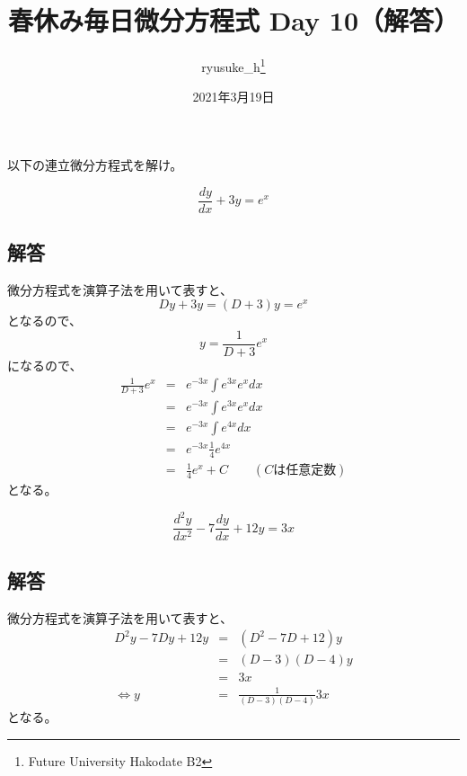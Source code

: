 \documentclass[a4j]{jsarticle}
\title{春休み毎日微分方程式 Day 10（解答）}
\author{ryusuke\_h\thanks{Future University Hakodate B2}}
\date{2021年3月19日}
\begin{document}
\begin{spacing}{1.6}
\maketitle

以下の連立微分方程式を解け。\\
\begin{qparts}
  \qpart
  \begin{equation*}
    \frac{dy}{dx} + 3y = e ^ x
  \end{equation*}

  \subsection*{解答}

  微分方程式を演算子法を用いて表すと、
  \begin{equation*}
    Dy + 3y = (D + 3)y = e ^ x
  \end{equation*}
  となるので、
  \begin{equation*}
    y = \frac{1}{D + 3}e ^ x
  \end{equation*}
  になるので、
  \begin{eqnarray*}
    \frac{1}{D + 3}e ^ x & = & e ^ {-3x} \int e ^ {3x} e ^ x dx \\
    & = & e ^ {-3x} \int e ^ {3x} e ^ x dx \\
    & = & e ^ {-3x} \int e ^ {4x} dx \\
    & = & e ^ {-3x} \frac{1}{4}e ^ {4x} \\
    & = & \frac{1}{4}e ^ x + C \qquad (Cは任意定数)
  \end{eqnarray*}
  となる。

  \newpage

  \qpart
  \begin{equation*}
    \frac{d^2y}{dx^2} - 7 \frac{dy}{dx} + 12y = 3x
  \end{equation*}

  \subsection*{解答}

  微分方程式を演算子法を用いて表すと、
  \begin{eqnarray*}
    D ^ 2y - 7Dy + 12y & = & (D ^ 2 - 7D + 12)y \\
    & = & (D - 3)(D - 4)y \\
    & = & 3x \\
    \Leftrightarrow
    y & = & \frac{1}{(D - 3)(D - 4)}3x
   \end{eqnarray*}
   となる。\\


\end{qparts}
\end{spacing}
\end{document}
